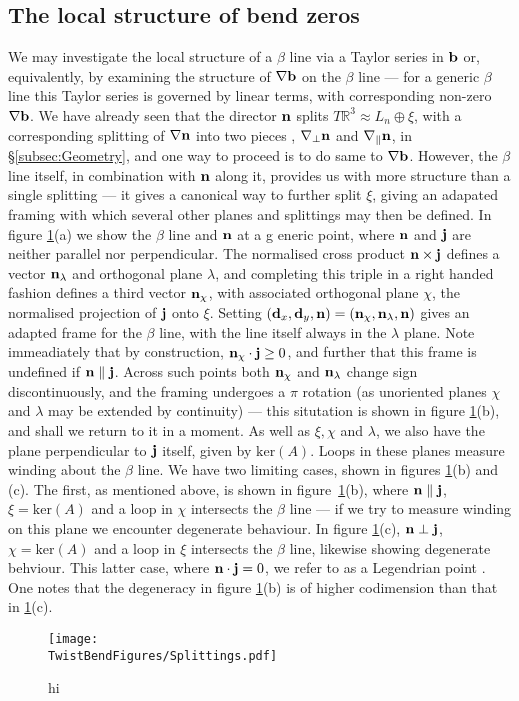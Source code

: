 \subsection{The local structure of bend zeros}
We may investigate the local structure of a $\beta$ line via a Taylor series in $\mathbf{b}$ or, equivalently, by examining the structure of $\nabla \mathbf{b}$ on the $\beta$ line --- for a generic $\beta$ line  this Taylor series is governed by linear terms, with corresponding  non-zero $\nabla \mathbf{b}$. We have already seen that the director $\mathbf{n}$ splits $T \mathbb{R}^3\approx L_n \oplus \xi$, with a corresponding splitting of $\nabla \mathbf{n}$ into two pieces , $\nabla_\perp \mathbf{n} $ and $\nabla_\parallel \mathbf{n}$, in \S\ref{subsec:Geometry}, and one way to proceed is to do same to $\nabla \mathbf{b}$. However, the $\beta$ line itself, in combination with $\mathbf{n}$ along it, provides us with more structure than a single splitting --- it gives a canonical way to further split $\xi$, giving an adapated framing with which several other planes and splittings may then be defined. In figure \ref{fig:Splittings}(a) we show the $\beta$ line and $\mathbf{n}$ at a g
eneric point, where $\mathbf{n}$ and $\mathbf{j}$ are neither parallel nor perpendicular. 
The normalised cross product $\mathbf{n} \times \mathbf{j}$ defines a vector $\mathbf{n}_\lambda$ and orthogonal plane $\lambda$, and completing this triple in a right handed fashion defines a third vector $\mathbf{n}_\chi$, with associated orthogonal plane $\chi$, the normalised projection of $\mathbf{j}$ onto $\xi$. Setting $(\mathbf{d}_x, \mathbf{d}_y, \mathbf{n}) = (\mathbf{n}_\chi, \mathbf{n}_\lambda, \mathbf{n})$ gives an adapted frame for the $\beta$ line, with the line itself always in the $\lambda$ plane. Note immeadiately that by construction, $\mathbf{n}_\chi \cdot \mathbf{j} \geq 0$, and further that this frame is undefined if $\mathbf{n} \parallel \mathbf{j}$. Across such points both $\mathbf{n}_\chi$ and $\mathbf{n}_\lambda$ change sign discontinuously, and the framing undergoes a $\pi$ rotation (as unoriented planes $\chi$ and $\lambda$ may be extended by continuity) --- this situtation is shown in figure  \ref{fig:Splittings}(b), and shall we return to it in a moment. As well as $\xi, \chi$ and $\lambda$, we also have the plane perpendicular to $\mathbf{j}$ itself, given by $\mathrm{ker}(A)$. Loops in these planes measure winding about the $\beta$ line. We have two limiting cases, shown in figures \ref{fig:Splittings}(b) and (c). The first, as mentioned above, is shown in figure~\ref{fig:Splittings}(b), where $\mathbf{n} \parallel \mathbf{j}$, $\xi = \mathrm{ker}(A)$ and a loop in $\chi$ intersects the $\beta$ line --- if we try to measure winding on this plane we encounter degenerate behaviour. In figure \ref{fig:Splittings}(c), $\mathbf{n} \perp \mathbf{j}$, $\chi = \mathrm{ker}(A)$ and a loop in $\xi$  intersects the $\beta$ line, likewise showing degenerate behviour. This latter case, where $\mathbf{n} \cdot \mathbf{j}= 0$, we refer to as a Legendrian point \citep{Geiges2009}. One notes that the degeneracy in figure \ref{fig:Splittings}(b) is of higher codimension than that in \ref{fig:Splittings}(c).
\begin{figure}[htbp]
    \centering
    \texttt{[image: \\TwistBendFigures/Splittings.pdf]}
    \caption{hi}
    \label{fig:Splittings}
\end{figure}

